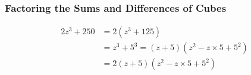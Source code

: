 
\subsubsection*{Factoring the Sums and Differences of Cubes}

\begin{example}[Factor $30c^3 - 20c^2 - 15c + 10$]
    \begin{align}
        2z^3 + 250 &= 2(z^3 + 125) \\
                   &= z^3 + 5^3 = (z + 5)(z^2 - z \times 5 + 5^2) \\
                   &= 2(z + 5)(z^2 - z \times 5 + 5^2) \\
    \end{align}
\end{example}

\newpage
